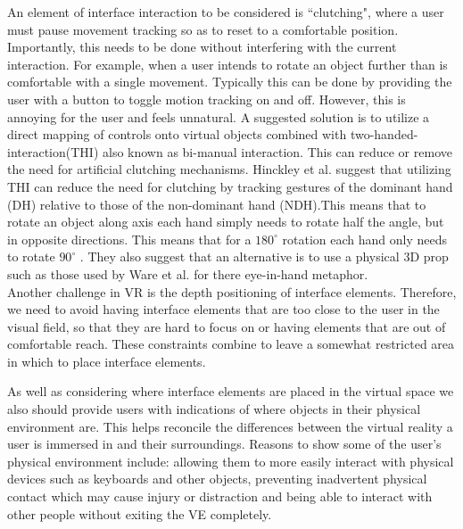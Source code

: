 \documentclass{sig-alternate-05-2015}
\begin{document}
 An element of interface interaction to be considered is ``clutching", where a user must pause movement tracking so as to reset to a comfortable position\cite{Hand1997}. Importantly, this needs to be done without interfering with the current interaction. For example, when a user intends to rotate an object further than is comfortable with a single movement. Typically this can be done by providing the user with a button to toggle motion tracking on and off. However, this is annoying for the user and feels unnatural\cite{Hand1997}.  A suggested solution is to utilize a direct mapping of controls onto virtual objects combined with two-handed-interaction(THI) also known as bi-manual interaction. This can reduce or remove the need for artificial clutching mechanisms\cite{Hand1997}.  Hinckley et al. suggest that utilizing THI can reduce the need for clutching by tracking gestures of the dominant hand (DH) relative to those of the non-dominant hand (NDH)\cite{Hinckley1994}.This means that to rotate an object along axis each hand simply needs to rotate half the angle, but in opposite directions. This means that for a $180^{\circ}$ rotation each hand only needs to rotate $90^{\circ}$ . They also suggest that an alternative is to use a physical 3D prop such as those used by Ware et al. for there eye-in-hand metaphor\cite{Ware1990}.\\
 
 Another challenge in VR is the depth positioning of interface elements.\cite{Alger2015} Therefore, we need to avoid having interface elements that are too close to the user in the visual field, so that they are hard to focus on or having elements that are out of comfortable reach. These constraints combine to leave a somewhat restricted area in which to place interface elements.
 
As well as considering where interface elements are placed in the virtual space we also should provide users with indications of where objects in their physical environment are. This helps reconcile the differences between the virtual reality a user is immersed in and their surroundings\cite{Duval2014}. Reasons to show some of the user's physical environment include: allowing them to more easily interact with physical devices such as keyboards and other objects, preventing inadvertent physical contact which may cause injury or distraction and being able to interact with other people without exiting the VE completely.
\end{document}
